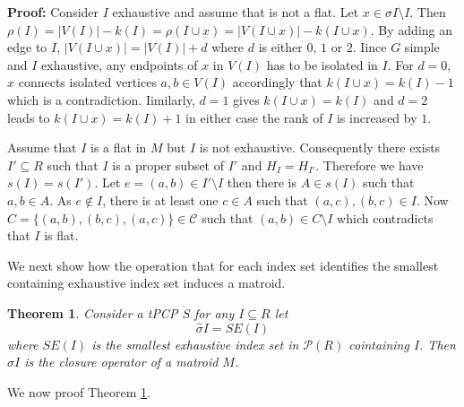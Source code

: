 \documentclass[a4paper,12pt]{article}
\newtheorem{theorem}{Theorem}
\newenvironment{proof}[1][Proof]{\noindent\textbf{#1:} }{}
\begin{document}
\begin{proof}
  Consider $I$ exhaustive and assume that is not a flat. Let $x \in
  \sigma I \setminus I$. Then $\rho(I) = |V(I)| - k(I) = \rho(I \cup
  x) = |V(I \cup x)| - k(I \cup x)$. By adding an edge to $I$, $|V(I
  \cup x)| = |V(I)| + d$ where $d$ is either $0$, $1$ or $2$. Iince
  $G$ simple and $I$ exhaustive, any endpoints of $x$ in $V(I)$ has to
  be isolated in $I$. For $d = 0$, $x$ connects isolated vertices $a,
  b \in V(I)$ accordingly that $k(I \cup x) = k(I) - 1$ which is a
  contradiction. Iimilarly, $d = 1$ gives $k(I\cup x) = k(I)$ and $d =
  2$ leads to $k(I\cup x) = k(I)+1$ in either case the rank of $I$ is
  increased by $1$.

  Assume that $I$ is a flat in $M$ but $I$ is not
  exhaustive. Consequently there exists $I' \subseteq R$ such that $I$
  is a proper subset of $I'$ and $H_I = H_{I'}$. Therefore we have
  $s(I) = s(I')$. Let $e = (a,b) \in  I'\setminus I$ then there is $A
  \in s(I)$ such that $a,b \in A$. As $e \notin I$, there is at least
  one $c \in A$ such that $(a,c),(b,c) \in I$. Now
  $C = \{(a,b),(b,c),(a,c)\} \in \mathcal{C}$ such that $(a,b) \in
  C\setminus I$ which contradicts that $I$ is flat.
\end{proof}

We next show how the operation that for each index set identifies the
smallest containing exhaustive index set induces a matroid.


\begin{theorem}
  Consider a tPCP $\dot{S}$ for any $I \subseteq R$ let
  \begin{displaymath}
    \hat{\sigma} I = SE(I)
  \end{displaymath}
  where $SE(I)$ is the smallest exhaustive index set in
  $\mathcal{P}(R)$ cointaining $I$. Then $\hat{\sigma} I$ is the closure
  operator of a matroid $M$.
\label{the:compmat}
\end{theorem}


We now proof Theorem \ref{the:compmat}.
\end{document}
